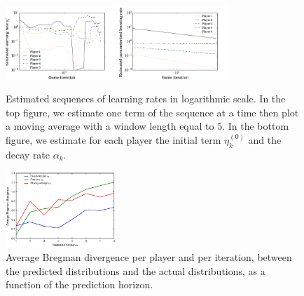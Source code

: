 \documentclass{sig-alternate-ipsn13}
\begin{document}
\begin{figure}[h!]
  \centering
  \includegraphics[width=0.37\textwidth]{images/moving_average_learning_rate}
  \includegraphics[width=0.37\textwidth]{images/sequence_rate}
  \caption{\footnotesize Estimated sequences of learning rates in logarithmic scale. In the top figure, we estimate one term of the sequence at a time then plot a moving average with a window length equal to $5$. In the bottom figure, we estimate for each player the initial term $\eta^{(0)}_k$ and the decay rate $\alpha_k$.}
  \label{fig:moving_average_learning_rate}
  \label{fig:sequence_rate}
\end{figure}



\begin{figure}[h]
  \centering
  \includegraphics[width=0.37\textwidth]{images/predictions_divergence}
  \caption{\footnotesize Average Bregman divergence per player and per iteration, between the predicted distributions and the actual distributions, as a function of the prediction horizon.}
  \label{fig:predictions_divergence}
\end{figure}
\end{document}
